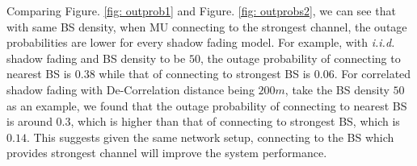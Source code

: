 \documentclass[journal,comsoc]{IEEEtran}
\begin{document}
\par Comparing Figure. \ref{fig: outprob1} and Figure. \ref{fig: outprobs2}, we can see that with same BS density, when MU connecting to the strongest channel, the outage probabilities are lower for every shadow fading model. For example, with \emph{i.i.d.} shadow fading and BS density to be $50$, the outage probability of connecting to nearest BS is $0.38$ while that of connecting to strongest BS is $0.06$. For correlated shadow fading with De-Correlation distance being $200m$, take the BS density $50$ as an example, we found that the outage probability of connecting to nearest BS is around $0.3$, which is higher than that of connecting to strongest BS, which is $0.14$. This suggests given the same network setup, connecting to the BS which provides strongest channel will improve the system performance. 
\end{document}
